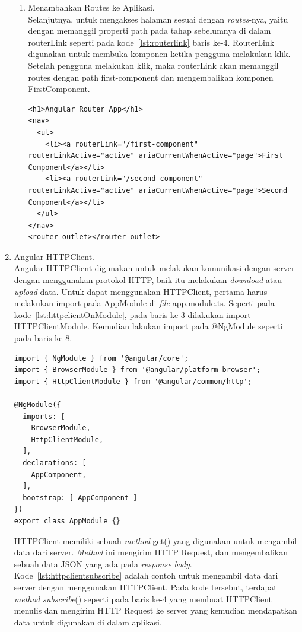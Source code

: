 \begin{enumerate}
\begin{enumerate}
	\item Menambahkan Routes ke Aplikasi. \\
	Selanjutnya, untuk mengakses halaman sesuai dengan \textit{routes}-nya, yaitu dengan memanggil properti path pada tahap sebelumnya di dalam routerLink seperti pada kode~\ref{lst:routerlink} baris ke-4. RouterLink digunakan untuk membuka komponen ketika pengguna melakukan klik. Setelah pengguna melakukan klik, maka routerLink akan memanggil routes dengan path first-component dan mengembalikan komponen FirstComponent.
	
\begin{lstlisting}[label={lst:routerlink}, caption={Contoh \textit{Routing} pada Angular}]
<h1>Angular Router App</h1>
<nav>
  <ul>
    <li><a routerLink="/first-component" routerLinkActive="active" ariaCurrentWhenActive="page">First Component</a></li>
    <li><a routerLink="/second-component" routerLinkActive="active" ariaCurrentWhenActive="page">Second Component</a></li>
  </ul>
</nav>
<router-outlet></router-outlet>
\end{lstlisting}

	\end{enumerate}	 
	
	\item Angular HTTPClient.  \\
	Angular HTTPClient digunakan untuk melakukan komunikasi dengan server dengan menggunakan protokol HTTP, baik itu melakukan \textit{download} atau \textit{upload} data. Untuk dapat menggunakan HTTPClient, pertama harus melakukan import pada AppModule di \textit{file} app.module.ts. Seperti pada kode~\ref{lst:httpclientOnModule}, pada baris ke-3 dilakukan import HTTPClientModule. Kemudian lakukan import pada @NgModule seperti pada baris ke-8.
	
\begin{lstlisting}[label={lst:httpclientOnModule}, caption={Contoh \textit{Routing} pada Angular}]
import { NgModule } from '@angular/core';
import { BrowserModule } from '@angular/platform-browser';
import { HttpClientModule } from '@angular/common/http';

@NgModule({
  imports: [
    BrowserModule,
    HttpClientModule,
  ],
  declarations: [
    AppComponent,
  ],
  bootstrap: [ AppComponent ]
})
export class AppModule {}
\end{lstlisting}
\newpage
	HTTPClient memiliki sebuah \textit{method} get() yang digunakan untuk mengambil data dari server. \textit{Method} ini mengirim HTTP Request, dan mengembalikan sebuah data JSON yang ada pada \textit{response body}. Kode~\ref{lst:httpclientsubscribe} adalah contoh untuk mengambil data dari server dengan menggunakan HTTPClient. Pada kode tersebut, terdapat \textit{method subscribe}() seperti pada baris ke-4 yang membuat HTTPClient menulis dan mengirim HTTP Request ke server yang kemudian mendapatkan data untuk digunakan di dalam aplikasi.


\end{enumerate}
